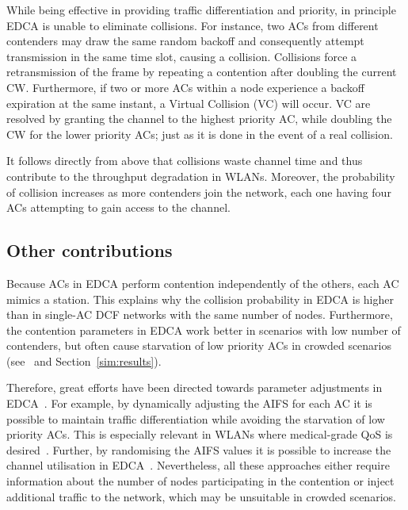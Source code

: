 While being effective in providing traffic differentiation and priority, in principle EDCA is unable to eliminate collisions. For instance, two ACs from different contenders may draw the same random backoff and consequently attempt transmission in the same time slot, causing a collision. Collisions force a retransmission of the frame by repeating a contention after doubling the current CW. Furthermore, if two or more ACs within a node experience a backoff expiration at the same instant, a Virtual Collision (VC) will occur. VC are resolved by granting the channel to the highest priority AC, while doubling the CW for the lower priority ACs; just as it is done in the event of a real collision.

It follows directly from above that collisions waste channel time and thus contribute to the throughput degradation in WLANs. Moreover, the probability of collision increases as more contenders join the network, each one having four ACs attempting to gain access to the channel.

\subsection{Other contributions}
Because ACs in EDCA perform contention independently of the others, each AC mimics a station. This explains why the collision probability in EDCA is higher than in single-AC DCF networks with the same number of nodes. Furthermore, the contention parameters in EDCA work better in scenarios with low number of contenders, but often cause starvation of low priority ACs in crowded scenarios (see~\cite{990806} and Section~\ref{sim:results}).

Therefore, great efforts have been directed towards parameter adjustments in EDCA~\cite{throughputGuarantees,6614899,4594854}. For example, by dynamically adjusting the AIFS for each AC it is possible to maintain traffic differentiation while avoiding the starvation of low priority ACs. This is especially relevant in WLANs where medical-grade QoS is desired~\cite{6614899}. Further, by randomising the AIFS values it is possible to increase the channel utilisation in EDCA~\cite{4594854}. Nevertheless, all these approaches either require information about the number of nodes participating in the contention or inject additional traffic to the network, which may be unsuitable in crowded scenarios.



